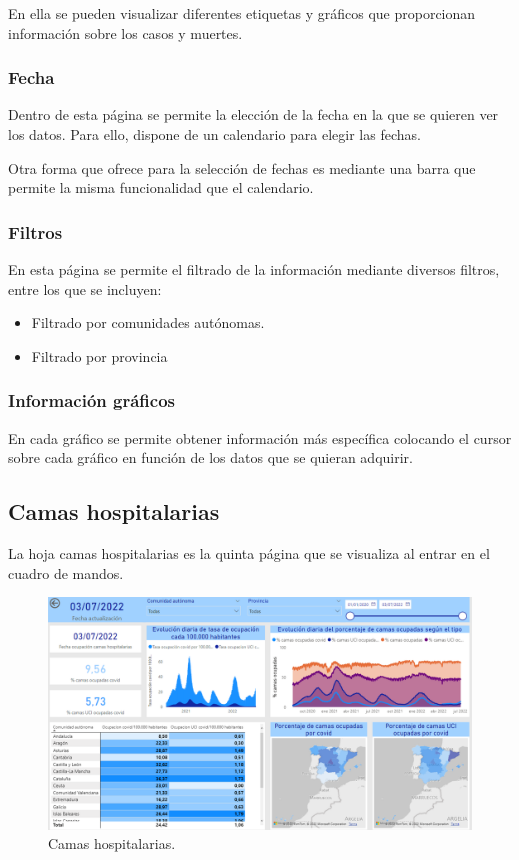 En ella se pueden visualizar diferentes etiquetas y gráficos que proporcionan información sobre los casos y muertes.

\subsubsection{Fecha}
Dentro de esta página se permite la elección de la fecha en la que se quieren ver los datos.
Para ello, dispone de un calendario para elegir las fechas.

Otra forma que ofrece para la selección de fechas es mediante una barra que permite la misma funcionalidad que el calendario.

\subsubsection{Filtros}
En esta página se permite el filtrado de la información mediante diversos filtros, entre los que se incluyen:
\begin{itemize}
    \item Filtrado por comunidades autónomas.
    \item Filtrado por provincia
\end{itemize}

\subsubsection{Información gráficos}
En cada gráfico se permite obtener información más específica colocando el cursor sobre cada gráfico en función de los datos que se quieran adquirir.


\subsection{Camas hospitalarias}
La hoja camas hospitalarias es la quinta página que se visualiza al entrar en el cuadro de mandos.

\begin{figure}[h]
    \advance\leftskip-0.5cm 
    \includegraphics[scale=0.55]{img/powerBI_camas.PNG}
    \caption{Camas hospitalarias.}
\end{figure}

